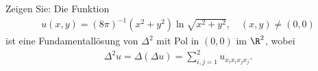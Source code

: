 
\begin{exercise}

Zeigen Sie: Die Funktion
\begin{align*}
  u(x,y) = (8\pi)^{-1}(x^2 + y^2)\ln\sqrt{x^2+y^2}, \quad (x,y) \neq (0,0)
\end{align*}
ist eine Fundamentallösung von $\Delta^2$ mit Pol in $(0,0)$ im $\R^2$, wobei
\begin{align*}
  \Delta^2u = \Delta(\Delta u) = \sum_{i,j = 1}^2 u_{x_ix_ix_jx_j}.
\end{align*}

\end{exercise}


